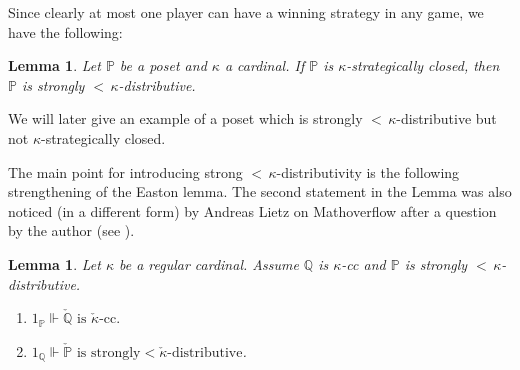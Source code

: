 \documentclass[12pt]{amsart}
\theoremstyle{definition}
\theoremstyle{remark}
\theoremstyle{plain}
\newtheorem{mylem}[mydef]{Lemma}
\numberwithin{mydef}{section}
\newcommand{\dP}{\mathbb{P}}
\newcommand{\dQ}{\mathbb{Q}}
\begin{document}
	Since clearly at most one player can have a winning strategy in any game, we have the following:
	
	\begin{mylem}
		Let $\dP$ be a poset and $\kappa$ a cardinal. If $\dP$ is $\kappa$-strategically closed, then $\dP$ is strongly ${<}\,\kappa$-distributive.
	\end{mylem}
	
	We will later give an example of a poset which is strongly ${<}\,\kappa$-distributive but not $\kappa$-strategically closed.
	
	The main point for introducing strong ${<}\,\kappa$-distributivity is the following strengthening of the Easton lemma. The second statement in the Lemma was also noticed (in a different form) by Andreas Lietz on Mathoverflow after a question by the author (see \cite{LietzAnswer}).
	
	\begin{mylem}\label{StrongEaston}
		Let $\kappa$ be a regular cardinal. Assume $\dQ$ is $\kappa$-cc and $\dP$ is strongly ${<}\,\kappa$-distributive.
		\begin{enumerate}
			\item $1_{\dP}\Vdash\check{\dQ}\text{ is }\check{\kappa}\text{-cc.}$
			\item $1_{\dQ}\Vdash\check{\dP}\text{ is strongly}<\check{\kappa}\text{-distributive}$.
		\end{enumerate}
	\end{mylem}
	
\end{document}
